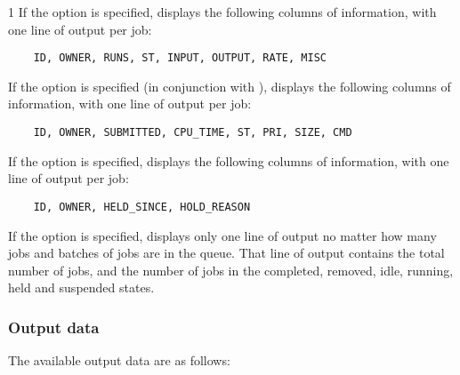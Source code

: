 \begin{ManPage}{\label{man-condor-q}}{1}
If the  option is specified,  displays the
following columns of information, with one line of output per job:
\begin{verbatim}
    ID, OWNER, RUNS, ST, INPUT, OUTPUT, RATE, MISC
\end{verbatim}

If the  option is specified (in conjunction with ),
 displays the
following columns of information, with one line of output per job:
\begin{verbatim}
    ID, OWNER, SUBMITTED, CPU_TIME, ST, PRI, SIZE, CMD
\end{verbatim}

If the  option is specified,  displays the
following columns of information, with one line of output per job:
\begin{verbatim}
    ID, OWNER, HELD_SINCE, HOLD_REASON
\end{verbatim}

If the  option is specified,  displays
only one line of output no matter how many jobs and batches of
jobs are in the queue.  That line of output contains the total
number of jobs, and the number of jobs in the completed, removed,
idle, running, held and suspended states.

\subsubsection*{Output data}
The available output data are as follows:


\end{ManPage}
